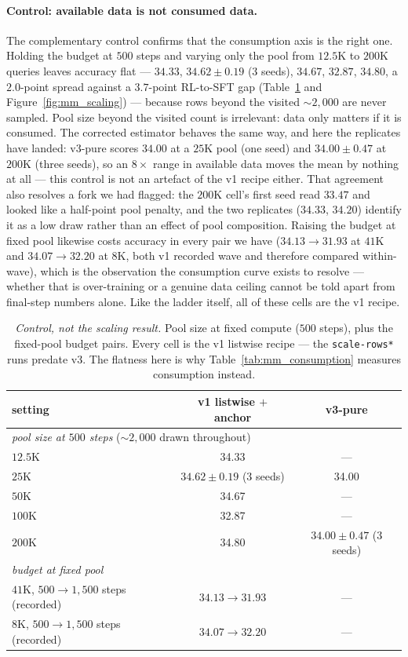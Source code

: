 \paragraph{Control: available data is not consumed data.} The complementary control confirms that
the consumption axis is the right one. Holding the budget at $500$ steps and varying only the
pool from $12.5$K to $200$K queries leaves accuracy flat --- $34.33$, $34.62 \pm 0.19$ (3 seeds),
$34.67$, $32.87$, $34.80$, a $2.0$-point spread against a $3.7$-point RL-to-SFT gap
(Table~\ref{tab:mm_scaling} and Figure~\ref{fig:mm_scaling}) --- because rows beyond the visited
${\sim}2{,}000$ are never sampled. Pool size beyond the visited count is irrelevant: data only
matters if it is consumed. The corrected estimator behaves the same way, and here the replicates
have landed: v3-pure scores $34.00$ at a $25$K pool (one seed) and $34.00 \pm 0.47$ at $200$K
(three seeds), so an $8\times$ range in available data moves the mean by nothing at all --- this
control is not an artefact of the v1 recipe either. That agreement also resolves a fork we had
flagged: the $200$K cell's first seed read $33.47$ and looked like a half-point pool penalty, and
the two replicates ($34.33$, $34.20$) identify it as a low draw rather than an effect of pool
composition. Raising the budget at fixed pool likewise costs accuracy in every pair
we have ($34.13 \to 31.93$ at $41$K and $34.07 \to 32.20$ at $8$K, both v1 recorded wave and
therefore compared within-wave), which is the observation the consumption curve exists to
resolve --- whether that is over-training or a genuine data ceiling cannot be told apart from
final-step numbers alone. Like the ladder itself, all of these cells are the v1 recipe.

\begin{table}[t]
\centering\small
\caption{\emph{Control, not the scaling result.} Pool size at fixed compute ($500$ steps), plus
the fixed-pool budget pairs. Every cell is the v1 listwise recipe --- the \texttt{scale-rows*}
runs predate v3. The flatness here is why Table~\ref{tab:mm_consumption} measures consumption
instead.}
\label{tab:mm_scaling}
\begin{tabular}{lcc}
\toprule
setting & v1 listwise $+$ anchor & v3-pure \\
\midrule
\multicolumn{3}{l}{\emph{pool size at $500$ steps} (${\sim}2{,}000$ drawn throughout)} \\
\quad $12.5$K  & 34.33 & --- \\
\quad $25$K    & $34.62 \pm 0.19$ (3 seeds) & 34.00 \\
\quad $50$K    & 34.67 & --- \\
\quad $100$K   & 32.87 & --- \\
\quad $200$K   & 34.80 & $34.00 \pm 0.47$ (3 seeds) \\
\midrule
\multicolumn{3}{l}{\emph{budget at fixed pool}} \\
\quad $41$K, $500 \to 1{,}500$ steps (recorded) & $34.13 \to 31.93$ & --- \\
\quad $8$K, $500 \to 1{,}500$ steps (recorded)  & $34.07 \to 32.20$ & --- \\
\bottomrule
\end{tabular}
\end{table}


